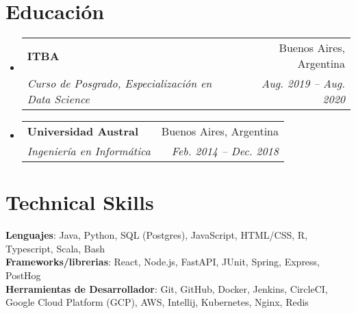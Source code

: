 \documentclass[letterpaper,11pt]{article}
\makeatletter
\newcommand{\resumeSubheading}[4]{
  \vspace{-2pt}\item
    \begin{tabular*}{0.97\textwidth}[t]{l@{\extracolsep{\fill}}r}
      \textbf{#1} & #2 \\
      \textit{\small#3} & \textit{\small #4} \\
    \end{tabular*}\vspace{-7pt}
}
\newcommand{\resumeSubHeadingListStart}{\begin{itemize}[leftmargin=0.15in, label={}]}
\newcommand{\resumeSubHeadingListEnd}{\end{itemize}}
\makeatother
\begin{document}
\section{Educación}
  \resumeSubHeadingListStart
    \resumeSubheading
      {ITBA}{Buenos Aires, Argentina}
      {Curso de Posgrado, Especialización en Data Science}{Aug. 2019 -- Aug. 2020}
    \resumeSubheading
      {Universidad Austral}{Buenos Aires, Argentina}
      {Ingeniería en Informática}{Feb. 2014 -- Dec. 2018}
  \resumeSubHeadingListEnd


\section{Technical Skills}
 \begin{itemize}[leftmargin=0.15in, label={}]
    \small{\item{
     \textbf{Lenguajes}{: Java, Python, SQL (Postgres), JavaScript, HTML/CSS, R, Typescript, Scala, Bash} \\
     \textbf{Frameworks/librerias}{: React, Node.js, FastAPI, JUnit, Spring, Express, PostHog} \\
     \textbf{Herramientas de Desarrollador}{: Git, GitHub, Docker, Jenkins, CircleCI, Google Cloud Platform (GCP), AWS, Intellij, Kubernetes, Nginx, Redis} \\
    }}
 \end{itemize}

\end{document}
